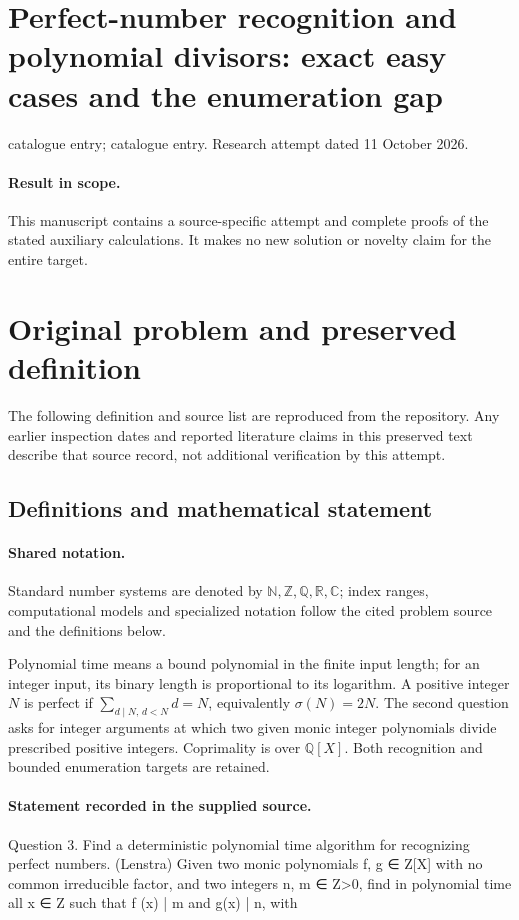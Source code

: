 \documentclass[11pt]{article}
\begin{document}
\section*{Perfect-number recognition and polynomial divisors: exact easy cases and the enumeration gap}
\noindent catalogue entry; catalogue entry. Research attempt dated 11 October 2026.
\paragraph{Result in scope.}This manuscript contains a source-specific attempt and complete proofs of the stated auxiliary calculations. It makes no new solution or novelty claim for the entire target.
\section{Original problem and preserved definition}
The following definition and source list are reproduced from the repository. Any earlier inspection dates and reported literature claims in this preserved text describe that source record, not additional verification by this attempt.
\subsection{Definitions and mathematical statement}

\paragraph{Shared notation.}Standard number systems are denoted by $\mathbb N,\mathbb Z,\mathbb Q,\mathbb R,\mathbb C$; index ranges, computational models and specialized notation follow the cited problem source and the definitions below.


Polynomial time means a bound polynomial in the finite input length; for an integer input, its binary length is proportional to its logarithm. A positive integer $N$ is perfect if $\sum_{d\mid N,\,d<N}d=N$, equivalently $\sigma(N)=2N$. The second question asks for integer arguments at which two given monic integer polynomials divide prescribed positive integers. Coprimality is over $\mathbb Q[X]$. Both recognition and bounded enumeration targets are retained.
\paragraph{Statement recorded in the supplied source.}
Question 3. Find a deterministic polynomial time algorithm for recognizing perfect numbers. (Lenstra) Given two monic polynomials f, g ∈ Z[X] with no common irreducible factor, and two integers n, m ∈ Z>0, find in polynomial time all x ∈ Z such that f (x) | m and g(x) | n, with
\end{document}
